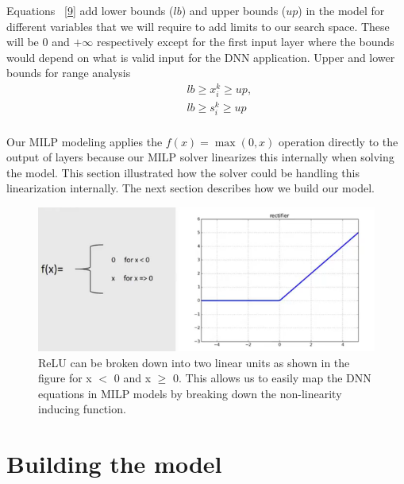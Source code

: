 Equations ~\ref{9} add lower bounds ($lb$) and upper bounds ($up$) in the  model for different variables that we will  require to add limits to our search space.  
These will be 0 and $+\infty$ respectively except for the first input layer
where the bounds would depend on what is valid input for the DNN application.
Upper and lower bounds for range analysis
\begin{equation}
\label{9}
\begin{aligned}
& & & lb \geq x_i^k \geq up, \\
& & &  lb \geq s_i^k \geq up \\
\end{aligned}
\end{equation}








Our MILP modeling applies the $f(x) = \max(0, x)$ operation directly to the output of layers because our MILP solver linearizes this internally when solving the model.
This section illustrated how the solver could be handling this linearization internally. The next section describes how we build our model.




\begin{figure}
	\centering
	\includegraphics[width=0.7\linewidth]{Images/ReLUbreakdown}
	\caption{ReLU can be broken down into two linear units as shown in the figure for x $<$ 0 and x $\geq$ 0. This allows us to easily map the DNN equations in MILP models by breaking down the non-linearity inducing function.}
	\label{fig:relubreakdown}
\end{figure}

\section{Building the model}
\label{section:attacks}

